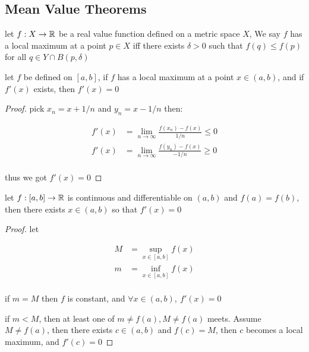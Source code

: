 \subsection{Mean Value Theorems}

\begin{definition}
    let $f: X \to \mathbb{R}$ be a real value function defined on a metric space $X$,
    We say $f$ has a local maximum at a point $p \in X$ iff there exists $\delta > 0$  
    such that $f(q) \le f(p)$ for all $q \in Y \cap B(p, \delta)$
\end{definition}

\begin{thm}
    \label{thm:local-maximum-derive-zero}
    let $f$ be defined on $[a,b]$, if $f$ has a local maximum at a point $x \in (a,b)$,
    and if $f'(x)$ exists, then $f'(x) = 0$
\end{thm}

\begin{proof}
   pick $x_n = x  + 1/n$  and $y_n = x - 1/n$ then:

   \begin{align*}
        f'(x) &= \lim_{n \to \infty}\frac{f(x_n) - f(x)}{1/n} \le 0 \\
        f'(x) &= \lim_{n \to \infty}\frac{f(y_n) - f(x)}{-1/n} \ge 0 \\
   \end{align*}
   
   thus we got $f'(x) = 0$
\end{proof}

\begin{thm}
    \label{thm:Rolle-Theorem}
    let $f: [a,b] \to \mathbb{R}$ is continuous and differentiable on $(a,b)$ and $f(a) = f(b)$,
    then there exists $x \in (a,b)$ so that $f'(x) = 0$
\end{thm}

\begin{proof}
    let 
    
    \begin{align*}
        M &= \sup_{x \in [a,b]} f(x) \\
        m &= \inf_{x \in [a,b]} f(x) \\
    \end{align*}

    if $m = M$ then $f$ is constant, and $\forall x \in (a,b), \: f'(x) = 0$

    if $m < M$, then at least one of $m \ne f(a), M \ne f(a)$ meets. Assume $M \ne f(a)$, then 
    there exists $c \in (a,b)$ and $f(c) = M$, then $c$ becomes a local maximum, and $f'(c) = 0$
\end{proof}


